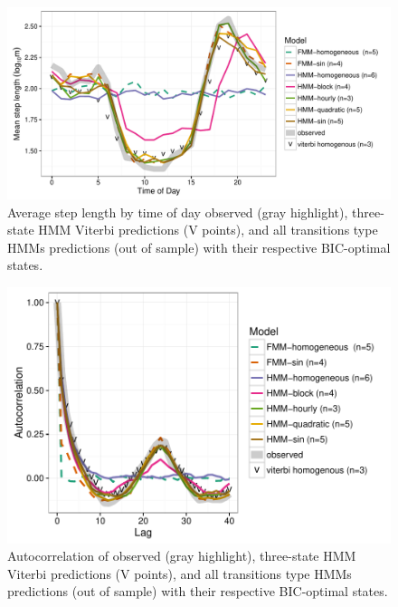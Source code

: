 \documentclass{bmcart}
\begin{document}
\begin{backmatter}
\begin{figure}[h!]
   \includegraphics[width=5in]{figure/avg_step_length_by_time-1}
  \caption{ Average step length by time of day observed (gray highlight), three-state HMM Viterbi predictions (V points), and all transitions type HMMs predictions (out of sample) with their respective BIC-optimal states.}
      \end{figure}
      
\clearpage
      
\begin{figure}[h!]
   \includegraphics[width=5in]{figure/acf_plot-1}
  \caption{ Autocorrelation of observed (gray highlight), three-state HMM Viterbi predictions (V points), and all transitions type HMMs predictions (out of sample) with their respective BIC-optimal states.}
      \end{figure}
      
\clearpage
      

\end{backmatter}
\end{document}
